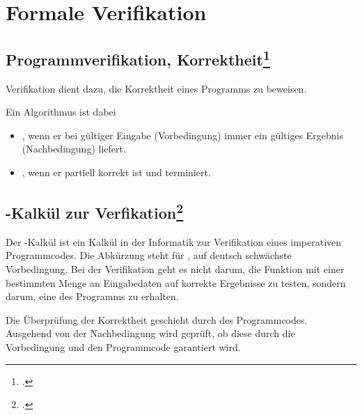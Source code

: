 \documentclass{lehramt-informatik-haupt}
\begin{document}

\chapter{Formale Verifikation}

%

\section{Programmverifikation, Korrektheit\footcite[Seite 14]{sosy:fs:5}}

Verifikation dient dazu, die Korrektheit eines Programms
 zu beweisen.

Ein Algorithmus ist dabei

\begin{itemize}

\item {}, wenn er bei gültiger Eingabe
(Vorbedingung) immer ein gültiges Ergebnis (Nachbedingung) liefert.

\item {}, wenn er partiell korrekt ist und terminiert.
\end{itemize}

%

\section{-Kalkül zur Verfikation\footcite[Seite 15]{sosy:fs:5}}

Der -Kalkül ist ein Kalkül in der Informatik zur Verifikation
eines imperativen Programmcodes. Die Abkürzung  steht für
, auf deutsch schwächste Vorbedingung. Bei
der Verifikation geht es nicht darum, die Funktion mit einer bestimmten
Menge an Eingabedaten auf korrekte Ergebnisse zu testen, sondern darum,
eine  des
Programms zu erhalten.

Die Überprüfung der Korrektheit geschieht durch 
des Programmcodes. Ausgehend von der Nachbedingung wird geprüft, ob
diese durch die Vorbedingung und den Programmcode garantiert wird.
\end{document}
